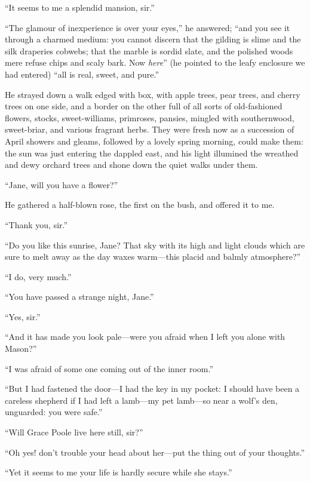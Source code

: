 \enquote{It seems to me a splendid mansion, sir.}

\enquote{The glamour of inexperience is over your eyes,} he answered;
\enquote{and you see it through a charmed medium: you cannot discern that the
gilding is slime and the silk draperies cobwebs; that the marble is
sordid slate, and the polished woods mere refuse chips and scaly bark. 
Now \emph{here}} (he pointed to the leafy enclosure we had entered)
\enquote{all is real, sweet, and pure.}

He strayed down a walk edged with box, with apple trees, pear trees, and
cherry trees on one side, and a border on the other full of all sorts of
old-fashioned flowers, stocks, sweet-williams, primroses, pansies,
mingled with southernwood, sweet-briar, and various fragrant herbs. 
They were fresh now as a succession of April showers and gleams,
followed by a lovely spring morning, could make them: the sun was just
entering the dappled east, and his light illumined the wreathed and dewy
orchard trees and shone down the quiet walks under them.

\enquote{Jane, will you have a flower?}

He gathered a half-blown rose, the first on the bush, and offered it to
me.

\enquote{Thank you, sir.}

\enquote{Do you like this sunrise, Jane? That sky with its high and
light clouds which are sure to melt away as the day waxes warm---this
placid and balmly atmosphere?}

\enquote{I do, very much.}

\enquote{You have passed a strange night, Jane.}

\enquote{Yes, sir.}

\enquote{And it has made you look pale---were you afraid when I left you
alone with Mason?}

\enquote{I was afraid of some one coming out of the inner room.}

\enquote{But I had fastened the door---I had the key in my pocket: I
should have been a careless shepherd if I had left a lamb---my pet
lamb---so near a wolf's den, unguarded: you were safe.}

\enquote{Will Grace Poole live here still, sir?}

\enquote{Oh yes! don't trouble your head about her---put the thing out
of your thoughts.}

\enquote{Yet it seems to me your life is hardly secure while she stays.}

